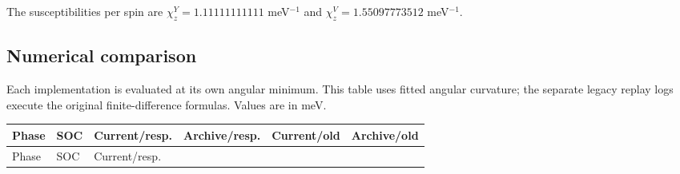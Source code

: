 The susceptibilities per spin are \(\chi_z^{Y}=1.11111111111\)
meV\(^{-1}\) and \(\chi_z^{V}=1.55097773512\) meV\(^{-1}\).

\subsection{Numerical comparison}\label{sec-results}

Each implementation is evaluated at its own angular minimum. This table
uses fitted angular curvature; the separate legacy replay logs execute
the original finite-difference formulas. Values are in meV.

\begin{longtable}[]{@{}
  >{\raggedright\arraybackslash}p{}
  >{\raggedright\arraybackslash}p{}
  >{\raggedleft\arraybackslash}p{}
  >{\raggedleft\arraybackslash}p{}
  >{\raggedleft\arraybackslash}p{}
  >{\raggedleft\arraybackslash}p{}@{}}
\toprule\noalign{}
\begin{minipage}[b]{\linewidth}\raggedright
Phase
\end{minipage} & \begin{minipage}[b]{\linewidth}\raggedright
SOC
\end{minipage} & \begin{minipage}[b]{\linewidth}\raggedleft
Current/resp.
\end{minipage} & \begin{minipage}[b]{\linewidth}\raggedleft
Archive/resp.
\end{minipage} & \begin{minipage}[b]{\linewidth}\raggedleft
Current/old
\end{minipage} & \begin{minipage}[b]{\linewidth}\raggedleft
Archive/old
\end{minipage} \\
\midrule\noalign{}
\endfirsthead
\toprule\noalign{}
\begin{minipage}[b]{\linewidth}\raggedright
Phase
\end{minipage} & \begin{minipage}[b]{\linewidth}\raggedright
SOC
\end{minipage} & \begin{minipage}[b]{\linewidth}\raggedleft
Current/resp.

\end{minipage}
\end{longtable}
